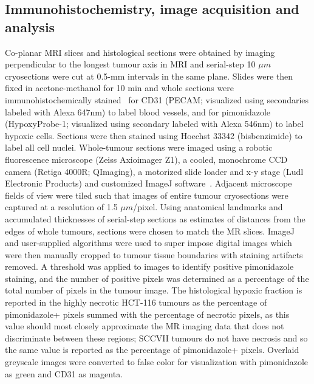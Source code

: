 \subsection{Immunohistochemistry, image acquisition and analysis}
Co-planar MRI slices and histological sections were obtained by imaging perpendicular to the longest tumour axis in MRI and serial-step 10 $\mu m$ cryosections were cut at 0.5-mm intervals in the same plane.
Slides were then fixed in acetone-methanol for 10 min and whole sections were immunohistochemically stained~\cite{Kalra:2017is} for CD31 (PECAM; visualized using secondaries labeled with Alexa 647nm) to label blood vessels, and for pimonidazole (HypoxyProbe-1; visualized using secondary labeled with Alexa 546nm) to label hypoxic cells. Sections were then stained using Hoechst 33342 (bisbenzimide) to label all cell nuclei.
Whole-tumour sections were imaged using a robotic fluorescence microscope (Zeiss Axioimager Z1), a cooled, monochrome CCD camera (Retiga 4000R; QImaging), a motorized slide loader and x-y stage (Ludl Electronic Products) and customized ImageJ software~\cite{Collins:2007jr}. 
Adjacent microscope fields of view were tiled such that images of entire tumour cryosections were captured at a resolution of 1.5 $\mu m$/pixel. 
Using anatomical landmarks and accumulated thicknesses of serial-step sections as estimates of distances from the edges of whole tumours, sections were chosen to match the MR slices. 
ImageJ and user-supplied algorithms were used to super impose digital images which were then manually cropped to tumour tissue boundaries with staining artifacts removed. A threshold was applied to images to identify positive pimonidazole staining, and the number of positive pixels was determined as a percentage of the total number of pixels in the tumour image. The histological hypoxic fraction is reported in the highly necrotic HCT-116 tumours as the percentage of pimonidazole+ pixels summed with the percentage of necrotic pixels, as this value should most closely approximate the MR imaging data that does not discriminate between these regions; SCCVII tumours do not have necrosis and so the same value is reported as the percentage of pimonidazole+ pixels.
Overlaid greyscale images were converted to false color for visualization with pimonidazole as green and CD31 as magenta. 

